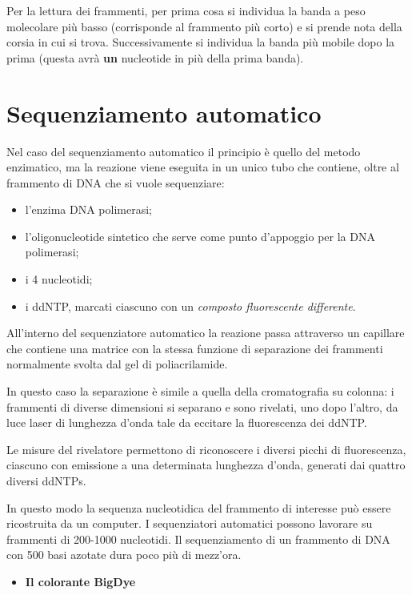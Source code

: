 \documentclass[11pt]{book}
\begin{document}
Per la lettura dei frammenti, per prima cosa si individua la banda a
peso molecolare più basso (corrisponde al frammento più corto) e si
prende nota della corsia in cui si trova. Successivamente si individua
la banda più mobile dopo la prima (questa avrà \textbf{un} nucleotide in
più della prima banda).

\section{Sequenziamento automatico}\label{sequenziamento-automatico}

Nel caso del sequenziamento automatico il principio è quello del metodo
enzimatico, ma la reazione viene eseguita in un unico tubo che contiene,
oltre al frammento di DNA che si vuole sequenziare:

\begin{itemize}
\itemsep1pt\parskip0pt
\item
  l'enzima DNA polimerasi;
\item
  l'oligonucleotide sintetico che serve come punto d'appoggio per la DNA
  polimerasi;
\item
  i 4 nucleotidi;
\item
  i ddNTP, marcati ciascuno con un \emph{composto fluorescente
  differente}.
\end{itemize}

All'interno del sequenziatore automatico la reazione passa attraverso un
capillare che contiene una matrice con la stessa funzione di separazione
dei frammenti normalmente svolta dal gel di poliacrilamide.

In questo caso la separazione è simile a quella della cromatografia su
colonna: i frammenti di diverse dimensioni si separano e sono rivelati,
uno dopo l'altro, da luce laser di lunghezza d'onda tale da eccitare la
fluorescenza dei ddNTP.

Le misure del rivelatore permettono di riconoscere i diversi picchi di
fluorescenza, ciascuno con emissione a una determinata lunghezza d'onda,
generati dai quattro diversi ddNTPs.

In questo modo la sequenza nucleotidica del frammento di interesse può
essere ricostruita da un computer. I sequenziatori automatici possono
lavorare su frammenti di 200-1000 nucleotidi. Il sequenziamento di un
frammento di DNA con 500 basi azotate dura poco più di mezz'ora.

\begin{itemize}
\itemsep1pt\parskip0pt
\item
  \textbf{Il colorante BigDye}
\end{itemize}
\end{document}
